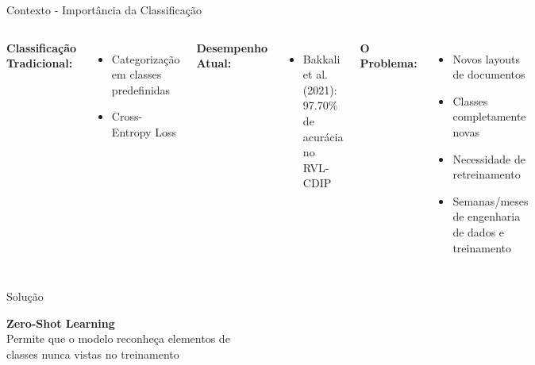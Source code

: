 \begin{frame}{Contexto - Importância da Classificação}
\begin{columns}
\textbf{Classificação Tradicional:}
\begin{itemize}
    \item Categorização em classes predefinidas
    \item Cross-Entropy Loss
\end{itemize}

\textbf{Desempenho Atual:}
\begin{itemize}
    \item Bakkali et al. (2021): 97.70\% de acurácia no RVL-CDIP
\end{itemize}

\pause
\textbf{O Problema:}
\begin{itemize}
    \item Novos layouts de documentos
    \item Classes completamente novas
    \item Necessidade de retreinamento
    \item Semanas/meses de engenharia de dados e treinamento
\end{itemize}

\end{columns}
\end{frame}

\begin{frame}{Solução}
    \begin{center}
        {\Huge \textbf{Zero-Shot Learning}}\\ \vspace{0.5cm}
        Permite que o modelo reconheça elementos de\\ classes nunca vistas no treinamento
    \end{center}
\end{frame}

